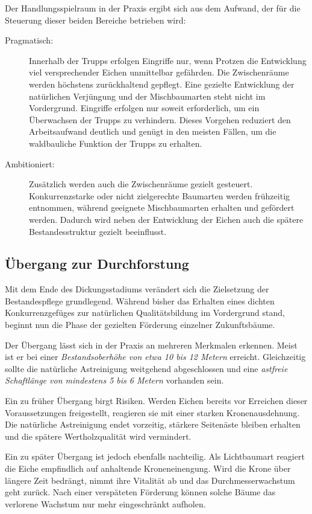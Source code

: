 \documentclass[twocolumn, bibliography=totoc, abstract=true]{scrartcl}
\begin{document}
Der Handlungsspielraum in der Praxis ergibt sich aus dem Aufwand, der für die Steuerung dieser beiden Bereiche betrieben wird:

\begin{description}
\item[Pragmatisch:] Innerhalb der Trupps erfolgen Eingriffe nur, wenn Protzen die Entwicklung viel versprechender Eichen unmittelbar gefährden. Die Zwischenräume werden höchstens zurückhaltend gepflegt. Eine gezielte Entwicklung der natürlichen Verjüngung und der Mischbaumarten steht nicht im Vordergrund. Eingriffe erfolgen nur soweit erforderlich, um ein Überwachsen der Trupps zu verhindern. Dieses Vorgehen reduziert den Arbeitsaufwand deutlich und genügt in den meisten Fällen, um die waldbauliche Funktion der Trupps zu erhalten.
\item[Ambitioniert:] Zusätzlich werden auch die Zwischenräume gezielt gesteuert. Konkurrenzstarke oder nicht zielgerechte Baumarten werden frühzeitig entnommen, während geeignete Mischbaumarten erhalten und gefördert werden. Dadurch wird neben der Entwicklung der Eichen auch die spätere Bestandesstruktur gezielt beeinflusst.
\end{description}

\subsection{Übergang zur Durchforstung}

Mit dem Ende des Dickungsstadiums verändert sich die Zielsetzung der Bestandespflege grundlegend. Während bisher das Erhalten eines dichten Konkurrenzgefüges zur natürlichen Qualitätsbildung im Vordergrund stand, beginnt nun die Phase der gezielten Förderung einzelner Zukunftsbäume.

Der Übergang lässt sich in der Praxis an mehreren Merkmalen erkennen. Meist ist er bei einer \emph{Bestandsoberhöhe von etwa 10 bis 12 Metern} erreicht. Gleichzeitig sollte die natürliche Astreinigung weitgehend abgeschlossen und eine \emph{astfreie Schaftlänge von mindestens 5 bis 6 Metern} vorhanden sein.

Ein zu früher Übergang birgt Risiken. Werden Eichen bereits vor Erreichen dieser Voraussetzungen freigestellt, reagieren sie mit einer starken Kronenausdehnung. Die natürliche Astreinigung endet vorzeitig, stärkere Seitenäste bleiben erhalten und die spätere Wertholzqualität wird vermindert.

Ein zu später Übergang ist jedoch ebenfalls nachteilig. Als Lichtbaumart reagiert die Eiche empfindlich auf anhaltende Kroneneinengung. Wird die Krone über längere Zeit bedrängt, nimmt ihre Vitalität ab und das Durchmesserwachstum geht zurück. Nach einer verspäteten Förderung können solche Bäume das verlorene Wachstum nur mehr eingeschränkt aufholen.
\end{document}
